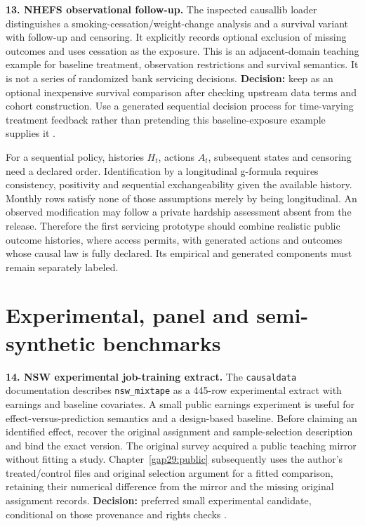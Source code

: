 \textbf{13. NHEFS observational follow-up.} The inspected causallib
loader distinguishes a smoking-cessation/weight-change analysis and a
survival variant with follow-up and censoring. It explicitly records
optional exclusion of missing outcomes and uses cessation as the
exposure. This is an adjacent-domain teaching example for baseline
treatment, observation restrictions and survival semantics. It is not a
series of randomized bank servicing decisions. \textbf{Decision:} keep
as an optional inexpensive survival comparison after checking upstream
data terms and cohort construction. Use a generated sequential decision
process for time-varying treatment feedback rather than pretending this
baseline-exposure example supplies it \citep{pd15_nhefs_pinned}.

For a sequential policy, histories \(H_t\), actions \(A_t\), subsequent
states and censoring need a declared order. Identification by a
longitudinal g-formula requires consistency, positivity and sequential
exchangeability given the available history. Monthly rows satisfy none
of those assumptions merely by being longitudinal. An observed
modification may follow a private hardship assessment absent from the
release. Therefore the first servicing prototype should combine
realistic public outcome histories, where access permits, with generated
actions and outcomes whose causal law is fully declared. Its empirical
and generated components must remain separately labeled.

\hypertarget{experimental-panel-and-semi-synthetic-benchmarks}{%
\section{Experimental, panel and semi-synthetic
benchmarks}\label{experimental-panel-and-semi-synthetic-benchmarks}}

\textbf{14. NSW experimental job-training extract.} The
\texttt{causaldata} documentation describes \texttt{nsw\_mixtape} as a
445-row experimental extract with earnings and baseline covariates. A
small public earnings experiment is useful for effect-versus-prediction
semantics and a design-based baseline. Before claiming an identified
effect, recover the original assignment and sample-selection description
and bind the exact version. The original survey acquired a public teaching mirror without fitting a study. Chapter~\ref{gap29:public} subsequently uses the author's treated/control files and original selection argument for a fitted comparison, retaining their numerical difference from the mirror and the missing original assignment records.
\textbf{Decision:} preferred small experimental candidate, conditional
on those provenance and rights checks \citep{pd15_nsw_docs}.

